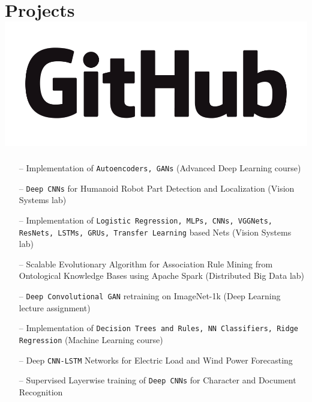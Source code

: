 
\section{Projects \hfill {\small  \href{https://github.com/saikat-roy}{\includegraphics[scale=0.03]{GitHub_Logo.png}}}}
	
\begin{itemize}[leftmargin=10pt, itemsep=0pt]
    \item[--] Implementation of \texttt{Autoencoders, GANs} (Advanced Deep Learning course)
    \item[--] \texttt{Deep CNNs} for Humanoid Robot Part Detection and Localization (Vision Systems lab)
    \item[--]Implementation of \texttt{Logistic Regression, MLPs, CNNs, VGGNets, ResNets, LSTMs, GRUs, Transfer Learning} based Nets (Vision Systems lab)
    \item[--] Scalable Evolutionary Algorithm for Association Rule Mining from Ontological Knowledge Bases using Apache Spark (Distributed Big Data lab) 
    \item[--] \texttt{Deep Convolutional GAN} retraining on ImageNet-1k (Deep Learning lecture assignment)
    \item[--] Implementation of \texttt{Decision Trees and Rules, NN Classifiers, Ridge Regression} (Machine Learning course)
    \item[--] Deep \texttt{CNN-LSTM} Networks for Electric Load and Wind Power Forecasting
    \item[--] Supervised Layerwise training of \texttt{Deep CNNs} for Character and Document Recognition
\end{itemize}
